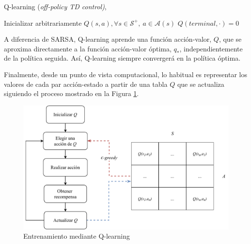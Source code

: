 \begin{algorithm}
\caption{Q-learning (\textit{off-policy TD control)}, \cite{sutton2018reinforcement}}
\label{alg:qlearning}
\DontPrintSemicolon
\LinesNumbered
\KwIn{$\alpha$: el \textit{step-size} $\in (0,1]$ \newline
      $\epsilon > 0$}

Inicializar arbitrariamente $Q(s, a), \forall s \in \mathcal{S^+}, \ a \in \mathcal{A}(s)$\;
$Q(terminal, \cdot) = 0$\;

\end{algorithm}

A diferencia de SARSA, Q-learning aprende una función acción-valor, $Q$, que se aproxima directamente a la función acción-valor óptima, $q_*$, independientemente de la política seguida. Así, Q-learning siempre convergerá en la política óptima.

Finalmente, desde un punto de vista computacional, lo habitual es representar los valores de cada par acción-estado a partir de una tabla $Q$ que se actualiza siguiendo el proceso mostrado en la Figura \ref{fig:qlearning}.

\begin{figure}
    \centering
    \includegraphics[width=\textwidth]{imagenes/qlearning.pdf}
    \caption{Entrenamiento mediante Q-learning}
    \label{fig:qlearning}
\end{figure}

